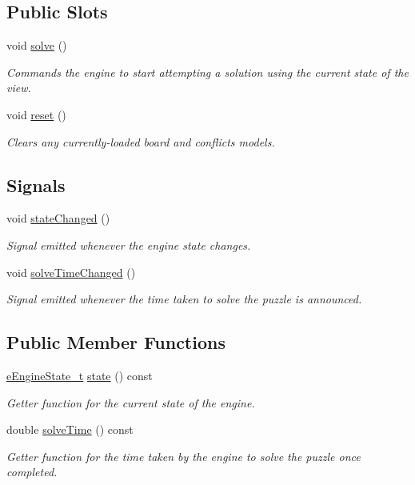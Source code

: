 \subsection*{Public Slots}
\begin{DoxyCompactItemize}
\item 
void \mbox{\hyperlink{class_solver_engine_a819bfa5cf96fc7fe05e9f091bf2666e2}{solve}} ()
\begin{DoxyCompactList}\small\item\em Commands the engine to start attempting a solution using the current state of the view. \end{DoxyCompactList}\item 
void \mbox{\hyperlink{class_solver_engine_af8e6ec12a994e8a463f2b3b1a0368e33}{reset}} ()
\begin{DoxyCompactList}\small\item\em Clears any currently-\/loaded board and conflicts models. \end{DoxyCompactList}\end{DoxyCompactItemize}
\subsection*{Signals}
\begin{DoxyCompactItemize}
\item 
void \mbox{\hyperlink{class_solver_engine_a73fd20671c169def4c85c53a2102e920}{state\+Changed}} ()
\begin{DoxyCompactList}\small\item\em Signal emitted whenever the engine state changes. \end{DoxyCompactList}\item 
void \mbox{\hyperlink{class_solver_engine_a66c3ab757c4e8aa50484f992f2b1ba7e}{solve\+Time\+Changed}} ()
\begin{DoxyCompactList}\small\item\em Signal emitted whenever the time taken to solve the puzzle is announced. \end{DoxyCompactList}\end{DoxyCompactItemize}
\subsection*{Public Member Functions}
\begin{DoxyCompactItemize}
\item 
\mbox{\hyperlink{class_solver_engine_acd25f3521e492d4aa924f922396bf02c}{e\+Engine\+State\+\_\+t}} \mbox{\hyperlink{class_solver_engine_a74305814124ef4b1ff74b082b53d155c}{state}} () const
\begin{DoxyCompactList}\small\item\em Getter function for the current state of the engine. \end{DoxyCompactList}\item 
double \mbox{\hyperlink{class_solver_engine_af647e59feb82e7a8aa445e1e03a386aa}{solve\+Time}} () const
\begin{DoxyCompactList}\small\item\em Getter function for the time taken by the engine to solve the puzzle once completed. \end{DoxyCompactList}\end{DoxyCompactItemize}
